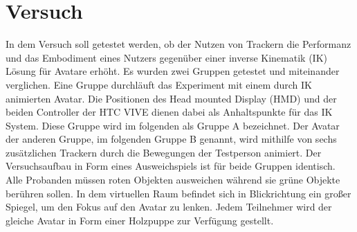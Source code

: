 \chapter{Versuch}
In dem Versuch soll getestet werden, ob der Nutzen von Trackern die Performanz und das Embodiment eines Nutzers gegenüber einer inverse Kinematik (IK) Lösung für Avatare erhöht. Es wurden zwei Gruppen getestet und miteinander verglichen. Eine Gruppe durchläuft das Experiment mit einem durch IK animierten Avatar. Die Positionen des Head mounted Display (HMD) und der beiden Controller der HTC VIVE dienen dabei als Anhaltspunkte für das IK System. Diese Gruppe wird im folgenden als Gruppe A bezeichnet.
Der Avatar der anderen Gruppe, im folgenden Gruppe B genannt, wird mithilfe von sechs zusätzlichen Trackern durch die Bewegungen der Testperson animiert. 
Der Versuchsaufbau in Form eines Ausweichspiels ist für beide Gruppen identisch. Alle Probanden müssen roten Objekten ausweichen während sie grüne Objekte berühren sollen. In dem virtuellen Raum befindet sich in Blickrichtung ein großer Spiegel, um den Fokus auf den Avatar zu lenken.
Jedem Teilnehmer wird der gleiche Avatar in Form einer Holzpuppe zur Verfügung gestellt.


